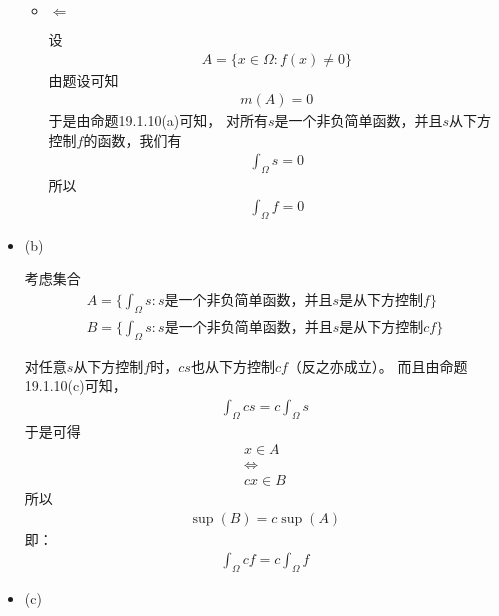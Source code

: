 \documentclass{article}
\begin{document}
\begin{itemize}
\begin{itemize}
          \item $\Leftarrow$

                设
                \begin{align*}
                  A = \{x \in \Omega : f(x) \neq 0\}
                \end{align*}
                由题设可知
                \begin{align*}
                  m(A) = 0
                \end{align*}
                于是由命题19.1.10(a)可知，
                对所有$s$是一个非负简单函数，并且$s$从下方控制$f$的函数，我们有
                \begin{align*}
                  \int_{\Omega} s = 0
                \end{align*}
                所以
                \begin{align*}
                  \int_{\Omega} f = 0
                \end{align*}
        \end{itemize}

  \item (b)

        考虑集合
        \begin{align*}
          A = \{\int_{\Omega} s: s \text{是一个非负简单函数，并且$s$是从下方控制$f$}\} \\
          B = \{\int_{\Omega} s: s \text{是一个非负简单函数，并且$s$是从下方控制$cf$}\}
        \end{align*}

        对任意$s$从下方控制$f$时，$cs$也从下方控制$cf$（反之亦成立）。
        而且由命题19.1.10(c)可知，
        \begin{align*}
          \int_{\Omega} cs = c \int_{\Omega} s
        \end{align*}
        于是可得
        \begin{align*}
          x \in A         \\
          \Leftrightarrow \\
          cx \in B
        \end{align*}
        所以
        \begin{align*}
          \sup(B) = c \sup(A)
        \end{align*}
        即：
        \begin{align*}
          \int_{\Omega} cf = c \int_{\Omega} f
        \end{align*}

  \item (c)


\end{itemize}
\end{document}
